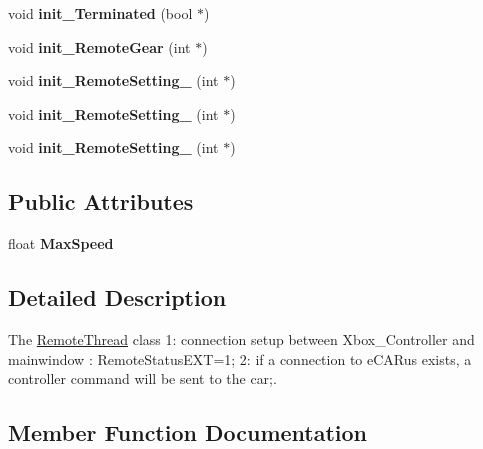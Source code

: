\begin{DoxyCompactItemize}
\item 
\hypertarget{class_remote_thread_ae5f3eaba7830d9bdf5ca2f05c212b160}{}void {\bfseries init\+\_\+\+Terminated} (bool $\ast$)\label{class_remote_thread_ae5f3eaba7830d9bdf5ca2f05c212b160}

\item 
\hypertarget{class_remote_thread_aca0c6a9df3fb70119fb2bd4a7e40f8af}{}void {\bfseries init\+\_\+\+Remote\+Gear} (int $\ast$)\label{class_remote_thread_aca0c6a9df3fb70119fb2bd4a7e40f8af}

\item 
\hypertarget{class_remote_thread_ab926c7f3a9ba29a1df52993a1747c128}{}void {\bfseries init\+\_\+\+Remote\+Setting\+\_} (int $\ast$)\label{class_remote_thread_ab926c7f3a9ba29a1df52993a1747c128}

\item 
\hypertarget{class_remote_thread_ad0362858a88dc58310be1171d22239c0}{}void {\bfseries init\+\_\+\+Remote\+Setting\+\_} (int $\ast$)\label{class_remote_thread_ad0362858a88dc58310be1171d22239c0}

\item 
\hypertarget{class_remote_thread_a37156a23aea69e77fd86cf97599afd08}{}void {\bfseries init\+\_\+\+Remote\+Setting\+\_} (int $\ast$)\label{class_remote_thread_a37156a23aea69e77fd86cf97599afd08}

\end{DoxyCompactItemize}
\subsection*{Public Attributes}
\begin{DoxyCompactItemize}
\item 
\hypertarget{class_remote_thread_a668f3195a6b2fd7f7881398ad8c0537f}{}float {\bfseries Max\+Speed}\label{class_remote_thread_a668f3195a6b2fd7f7881398ad8c0537f}

\end{DoxyCompactItemize}


\subsection{Detailed Description}
The \hyperlink{class_remote_thread}{Remote\+Thread} class 1\+: connection setup between Xbox\+\_\+\+Controller and mainwindow \+: Remote\+Status\+E\+X\+T=1; 2\+: if a connection to e\+C\+A\+Rus exists, a controller command will be sent to the car;. 

\subsection{Member Function Documentation}
\hypertarget{class_remote_thread_afaaf517a8ecef88feeaa477ac84da127}{}
